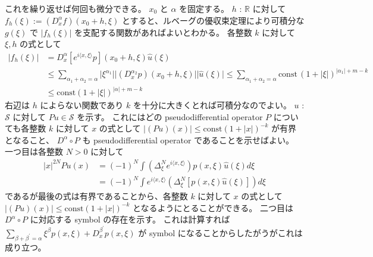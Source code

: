 \begin{Proof}
  これを繰り返せば何回も微分できる。
\itemthen
  \(x_0\) と \(\alpha\) を固定する。
  \(h\) : \(\mathbb{R}\) に対して \(f_h(\xi) := (D^\alpha_x f)(x_0 + h , \xi)\) とすると、ルベーグの優収束定理により可積分な \(g(\xi)\) で \(\lvert f_h(\xi) \rvert\) を支配する関数があればよいとわかる。
  各整数 \(k\) に対して \(\xi , h\) の式として
  \begin{align*}
    \lvert f_h(\xi) \rvert
    &= D^\alpha_x [e^{i \langle x , \xi \rangle} p](x_0 + h , \xi) \hat{u}(\xi) \\
    &\leq \sum_{\alpha_1 + \alpha_2 = \alpha} \lvert \xi^{\alpha_1} \rvert \lvert (D^{\alpha_2}_x p)(x_0 + h , \xi) \rvert \lvert \hat{u}(\xi) \rvert
    \leq \sum_{\alpha_1 + \alpha_2 = \alpha} \text{const} \, (1 + \lvert \xi \rvert)^{\lvert \alpha_1 \rvert + m - k} \\
    &\leq \text{const} (1 + \lvert \xi \rvert)^{\lvert \alpha \rvert + m - k}
  \end{align*}
  右辺は \(h\) によらない関数であり \(k\) を十分に大きくとれば可積分なのでよい。
\itemthen
  \(u\) : \(\mathscr{S}\) に対して \(P u \in \mathscr{S}\) を示す。
  これにはどの pseudodifferential operator \(P\) についても各整数 \(k\) に対して \(x\) の式として \(\lvert (P u)(x) \rvert \leq \text{const} (1 + \lvert x \rvert)^{-k}\) が有界となること、 \(D^\alpha \circ P\) も pseudodifferential operator であることを示せばよい。
  一つ目は各整数 \(N > 0\) に対して
  \begin{align*}
    \lvert x \rvert^{2N} Pu(x)
    &= (-1)^N \int (\Delta^N_{\xi} e^{i \langle x , \xi \rangle}) p(x , \xi) \hat{u}(\xi) d\xi \\
    &= (-1)^N \int e^{i \langle x , \xi \rangle} (\Delta^N_{\xi} [p(x,\xi) \hat{u}(\xi)]) d\xi
  \end{align*}
  であるが最後の式は有界であることから、各整数 \(k\) に対して \(x\) の式として \(\lvert (P u) (x) \rvert \leq \text{const} (1 + \lvert x \rvert)^{-k}\) となるようにとることができる。
  二つ目は \(D^\alpha \circ P\) に対応する symbol の存在を示す。
  これは計算すれば \(\sum_{\beta + \beta^{\prime} = \alpha} \xi^\beta p(x,\xi) + D^{\beta^\prime}_x p(x,\xi)\) が symbol になることからしたがうがこれは成り立つ。
\end{Proof}

